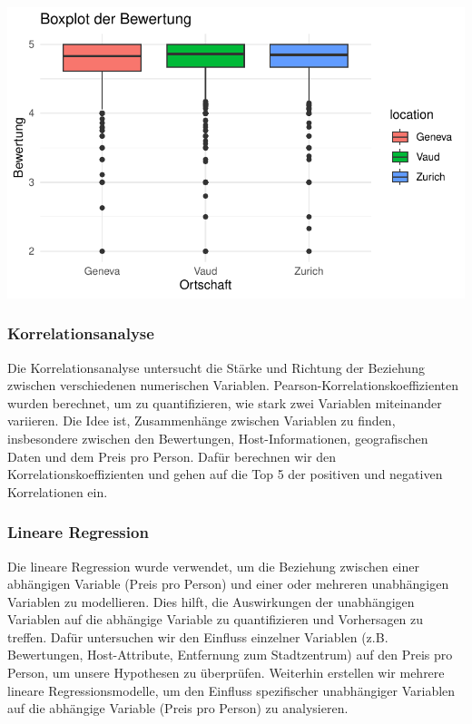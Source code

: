 \documentclass[
  journal,
]{IEEEtran}%
\begin{document}
\includegraphics{main_files/figure-pdf/descriptive-4.pdf}

\hypertarget{korrelationsanalyse}{%
\subsubsection{\texorpdfstring{\textbf{Korrelationsanalyse}}{Korrelationsanalyse}}\label{korrelationsanalyse}}

Die Korrelationsanalyse untersucht die Stärke und Richtung der Beziehung
zwischen verschiedenen numerischen Variablen.
Pearson-Korrelationskoeffizienten wurden berechnet, um zu
quantifizieren, wie stark zwei Variablen miteinander variieren. Die Idee
ist, Zusammenhänge zwischen Variablen zu finden, insbesondere zwischen
den Bewertungen, Host-Informationen, geografischen Daten und dem Preis
pro Person. Dafür berechnen wir den Korrelationskoeffizienten und gehen
auf die Top 5 der positiven und negativen Korrelationen ein.

\hypertarget{lineare-regression}{%
\subsubsection{\texorpdfstring{\textbf{Lineare
Regression}}{Lineare Regression}}\label{lineare-regression}}

Die lineare Regression wurde verwendet, um die Beziehung zwischen einer
abhängigen Variable (Preis pro Person) und einer oder mehreren
unabhängigen Variablen zu modellieren. Dies hilft, die Auswirkungen der
unabhängigen Variablen auf die abhängige Variable zu quantifizieren und
Vorhersagen zu treffen. Dafür untersuchen wir den Einfluss einzelner
Variablen (z.B. Bewertungen, Host-Attribute, Entfernung zum
Stadtzentrum) auf den Preis pro Person, um unsere Hypothesen zu
überprüfen. Weiterhin erstellen wir mehrere lineare Regressionsmodelle,
um den Einfluss spezifischer unabhängiger Variablen auf die abhängige
Variable (Preis pro Person) zu analysieren.
\end{document}
